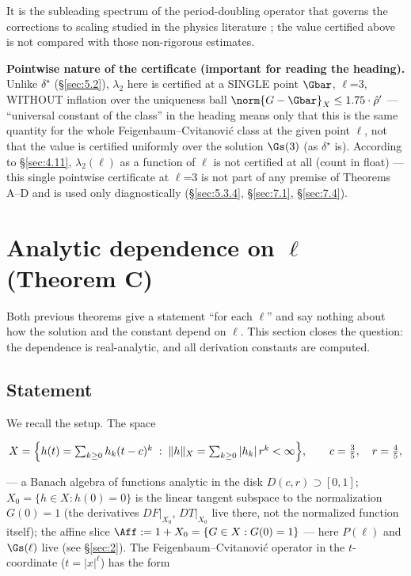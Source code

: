 It is the subleading spectrum of the period-doubling operator that governs the corrections to scaling studied in the physics literature \cite{mao1987corrections, reick1992universal}; the value certified above is not compared with those non-rigorous estimates.

\textbf{Pointwise nature of the certificate (important for reading the
heading).} Unlike $\delta^{\star}$ (\S\ref{sec:5.2}), $\lambda_2$ here is
certified at a SINGLE point $\Gbar$, $\ell$=3, WITHOUT inflation over the
uniqueness ball $\norm{G-\Gbar}_X \le 1.75\cdot \hat{\rho}'$ --- ``universal
constant of the class'' in the heading means only that this is the same
quantity for the whole Feigenbaum--Cvitanovi\'{c} class at the given point
$\ell$, not that the value is certified uniformly over the solution
$\Gs(3)$ (as $\delta^{\star}$ is). According to \S\ref{sec:4.11}, $\lambda_2(\ell)$ as a
function of $\ell$ is not certified at all (count in float) --- this single
pointwise certificate at $\ell$=3 is not part of any premise of Theorems A--D
and is used only diagnostically (\S\ref{sec:5.3.4}, \S\ref{sec:7.1}, \S\ref{sec:7.4}).



\section{Analytic dependence on $\ell$ (Theorem C)}
\label{sec:6}

Both previous theorems give a statement ``for each $\ell$'' and say nothing about
how the solution and the constant depend on $\ell$. This section closes the
question: the dependence is real-analytic, and all derivation constants are
computed.


\subsection{Statement}
\label{sec:6.1}

We recall the setup. The space

\[
X=\Bigl\{h(t)=\textstyle\sum_{k\ge0} h_k(t-c)^k\;:\;\|h\|_X=\sum_{k\ge0}|h_k|\,r^k<\infty\Bigr\},
\qquad c=\tfrac35,\quad r=\tfrac45,
\]

--- a Banach algebra of functions analytic in the disk $D(c,r)\supset[0,1]$;
$X_0=\{h\in X:h(0)=0\}$ is the linear tangent subspace to the normalization
$G(0)=1$ (the derivatives $DF|_{X_0}$, $DT|_{X_0}$ live there, not the
normalized function itself); the affine slice
$\Aff:=1+X_0=\{G\in X:G(0)=1\}$ --- here $P(\ell)$ and $\Gs(\ell)$
live (see \S\ref{sec:2}). The Feigenbaum--Cvitanović operator in the $t$-coordinate
($t=|x|^{\ell}$) has the form

